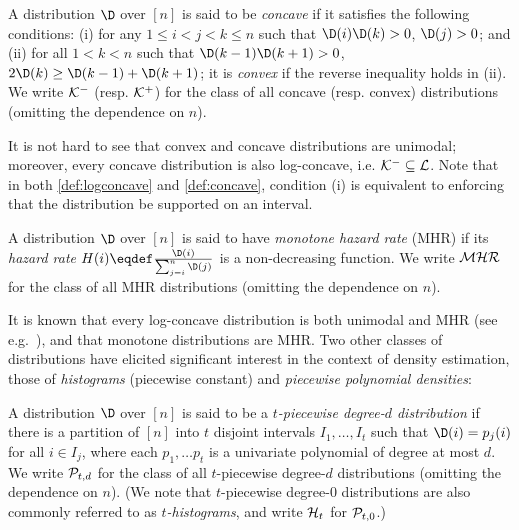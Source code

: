 \begin{definition}\label{def:concave}
  A distribution $\D$ over $[n]$ is said to be \emph{concave} if it satisfies the following conditions: \textsf{(i)} for any $1 \leq i < j < k \leq n$ such that $\D(i)\D(k) > 0$, $\D(j) > 0$; and \textsf{(ii)} for all $1 < k < n$ such that $\D(k - 1)\D(k + 1)>0$, $2\D(k) \geq \D(k - 1)+\D(k + 1)$; it is \emph{convex} if the reverse inequality holds in \textsf{(ii)}. We write $\classcve$ (resp. $\classcvx$) for the class of all concave (resp. convex) distributions (omitting the dependence on $n$).
\end{definition}
It is not hard to see that convex and concave distributions are unimodal; moreover, every concave distribution is also log-concave, i.e. $\classcve\subseteq\classlog$. Note that in both \cref{def:logconcave} and \cref{def:concave}, condition \textsf{(i)} is equivalent to enforcing that the distribution be supported on an interval.

\begin{definition}\label{def:mhr}
  A distribution $\D$ over $[n]$ is said to have \emph{monotone hazard rate} (MHR) if its \emph{hazard rate} $H(i)\eqdef \frac{\D(i)}{\sum_{j=i}^{n} \D(j)}$ is a non-decreasing function. We write $\classmhr$ for the class of all MHR distributions (omitting the dependence on $n$).
\end{definition}
It is known that every log-concave distribution is both unimodal and MHR (see e.g.~\cite[Proposition 10]{An:96}), and that monotone distributions are MHR. Two other classes of distributions have elicited significant interest in the context of density estimation, those of \emph{histograms} (piecewise constant) and \emph{piecewise polynomial densities}:
\begin{definition}\label{def:piecewise}
  A distribution $\D$ over $[n]$ is said to be a \emph{$t$-piecewise degree-$d$ distribution} if there is a partition of $[n]$ into $t$ disjoint intervals $I_1,\dots,I_t$ such that $\D(i) = p_j(i)$ for all $i \in I_j$, where each $p_1,\dots p_t$ is a univariate polynomial of degree at most $d$. We write $\classpoly$ for the class of all $t$-piecewise degree-$d$ distributions (omitting the dependence on $n$). (We note that {$t$-piecewise degree-$0$ distributions} are also commonly referred to as \emph{$t$-histograms}, and write $\classhist$ for $\classpoly[t,0]$.)
\end{definition}

